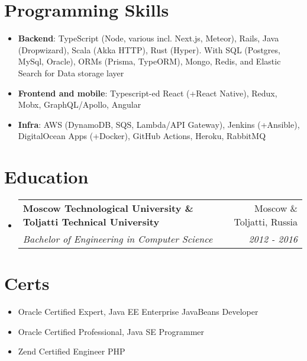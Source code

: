 \documentclass[letterpaper,10pt]{article}
\makeatletter
\newcommand{\resumeSubheading}[4]{
  \vspace{-1pt}\item
    \begin{tabular*}{0.97\textwidth}[t]{l@{\extracolsep{\fill}}r}
      \textbf{#1} & #2 \\
      \textit{\small#3} & \textit{\small #4} \\
    \end{tabular*}\vspace{-5pt}
}
\newcommand{\resumeSubHeadingListStart}{\begin{itemize}[leftmargin=*]}
\newcommand{\resumeSubHeadingListEnd}{\end{itemize}}
\makeatother
\begin{document}
%
\section{Programming Skills}
  \resumeSubHeadingListStart
    \item{
      \textbf{Backend}{: TypeScript (Node, various incl. Next.js, Meteor), Rails, Java (Dropwizard), Scala (Akka HTTP), Rust (Hyper). With SQL (Postgres, MySql, Oracle), ORMs (Prisma, TypeORM), Mongo, Redis, and Elastic Search for Data storage layer}
      \hfill
    }
    \item{
      \textbf{Frontend and mobile}{: Typescript-ed React (+React Native), Redux, Mobx, GraphQL/Apollo, Angular}
      \hfill
    }
    \item{
      \textbf{Infra}{: AWS (DynamoDB, SQS, Lambda/API Gateway), Jenkins (+Ansible), DigitalOcean Apps (+Docker), GitHub Actions, Heroku, RabbitMQ }
      \hfill
    }
  \resumeSubHeadingListEnd

\section{Education}
  \resumeSubHeadingListStart
    \resumeSubheading
      {Moscow Technological University \& Toljatti Technical University}{Moscow \& Toljatti, Russia}
      {Bachelor of Engineering in Computer Science}{2012 - 2016}
  \resumeSubHeadingListEnd

  \section{Certs}
    \resumeSubHeadingListStart
      \item
        {Oracle Certified Expert, Java EE Enterprise JavaBeans Developer}
      \item
        {Oracle Certified Professional, Java SE Programmer}
      \item
        {Zend Certified Engineer PHP}
    \resumeSubHeadingListEnd


\end{document}
